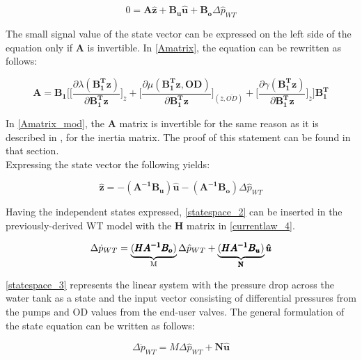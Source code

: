 \begin{equation}
 0 = \pmb{A} \pmb{\hat{z}} + \pmb{B_u} \pmb{\hat{u}} + \pmb{B_o} \Delta \hat{p}_{WT}    
 \label{statespace_2}
\end{equation}

The small signal value of the state vector can be expressed on the left side of the equation only if $\pmb{A}$ is invertible. In \eqref{Amatrix}, the equation can be rewritten as follows: 

\begin{equation}
  \pmb{A} = \pmb{B_1}\Bigg[ \bigg[ \frac{\partial{\lambda(\pmb{{B_1^{T}}}\pmb{z})}}{{\partial{\pmb{{B_1^{T}}}\pmb{z}}}}   \bigg]_{\bar{z}} +
\bigg[ \frac{\partial{\mu(\pmb{{B_1^{T}}}\pmb{z}, \pmb{OD})}}{{\partial{\pmb{{B_1^{T}}}\pmb{z}}}}  \bigg]_{(\bar{z}, \bar{OD})} +  \bigg[ \frac{\partial{\gamma(\pmb{{B_1^{T}}}\pmb{z})}}{{\partial{\pmb{{B_1^{T}}}\pmb{z}}}}   \bigg]_{\bar{z}}\Bigg] \pmb{{B_1^{T}}}
\label{Amatrix_mod}
\end{equation}

In \eqref{Amatrix_mod}, the $\pmb{A}$ matrix is invertible for the same reason as it is described in , for the inertia matrix. The proof of this statement can be found in that section. 
\\
Expressing the state vector the following yields:

\begin{equation}
 \pmb{\hat{z}} = -(\pmb{A^{-1}}\pmb{B_u})\pmb{\hat{u}} - (\pmb{A^{-1}}\pmb{B_o})\Delta \hat{p}_{WT}    
 \label{statespac_2}
\end{equation}

Having the independent states expressed, \eqref{statespace_2} can be inserted in the previously-derived WT model with the $\pmb{H}$ matrix in \eqref{currentlaw_4}. 

\begin{equation}
\Delta \dot{p}_{WT} = \underbrace{(\pmb{H}\pmb{A^{-1}}\pmb{B_o})}_\text{M}\Delta \hat{p}_{WT}  + \underbrace{(\pmb{H}\pmb{A^{-1}}\pmb{B_u})}_\text{\pmb{N}}\pmb{\hat{u}}  
 \label{statespace_3}
\end{equation}

\eqref{statespace_3} represents the linear system with the pressure drop across the water tank as a state and the input vector consisting of differential pressures from the pumps and OD values from the end-user valves. The general formulation of the state equation can be written as follows:  

\begin{equation}
\Delta \dot{p}_{WT} = M \Delta \hat{p}_{WT}  + \pmb{N}\pmb{\hat{u}}  
 \label{statespace_4}
\end{equation}

